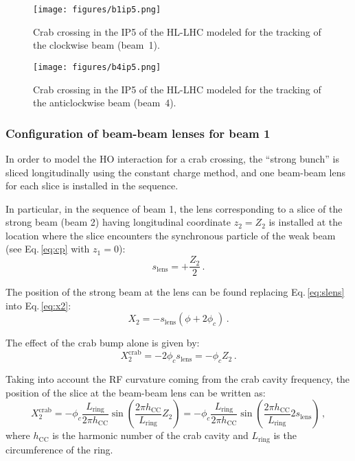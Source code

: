 \begin{figure}[p]
\centering
\texttt{[image: figures/b1ip5.png]}
\caption{\small Crab crossing in the IP5 of the HL-LHC modeled for the tracking of the clockwise beam (beam~1).  \label{fig:crab_ip5b1}}
\texttt{[image: figures/b4ip5.png]}
\caption{\small Crab crossing in the IP5 of the HL-LHC modeled for the tracking of the anticlockwise beam (beam~4). \label{fig:crab_ip5b4}}
\end{figure}

\subsubsection{Configuration of beam-beam lenses for beam 1}

In order to model the HO interaction for a crab crossing, the ``strong bunch'' is sliced longitudinally using the constant charge method, and one beam-beam lens for each slice is installed in the sequence.

In particular, in the sequence of beam 1, the lens corresponding to a slice of the strong beam (beam 2) having longitudinal coordinate $z_2=Z_2$ is installed at the location where the slice encounters the synchronous particle of the weak beam (see Eq.\,\eqref{eq:cp} with $z_1 = 0$):
\begin{equation}
    s_\text{lens} = +\frac{Z_2}{2}
    \, .
    \label{eq:slens}
\end{equation}


The position of the strong beam at the lens can be found replacing Eq.\,\eqref{eq:slens} into Eq.\,\eqref{eq:x2}:
\begin{equation}
   X_2 = - s_\text{lens} (\phi + 2 \phi_c)
   \, .
\end{equation}

The effect of the crab bump alone is given by:
\begin{equation}
   X^\text{crab}_2 = - 2 \phi_c s_\text{lens} = -\phi_c Z_2 \, .
\end{equation}

Taking into account the RF curvature coming from the crab cavity frequency, the position of the slice at the beam-beam lens can be written as:
\begin{equation}
   X^\text{crab}_2 = -\phi_c \frac{L_\text{ring}}{2 \pi h_\text{CC}} \sin\left(  \frac{2 \pi h_\text{CC}}{L_\text{ring}} Z_2\right) = -\phi_c \frac{L_\text{ring}}{2 \pi h_\text{CC}} \sin\left(  \frac{2 \pi h_\text{CC}}{L_\text{ring}} 2 s_\text{lens}\right)
   \, ,
   \label{eq:x2crab}
\end{equation}
where $h_\text{CC}$ is the harmonic number of the crab cavity and $L_\text{ring}$ is the circumference of the ring.

